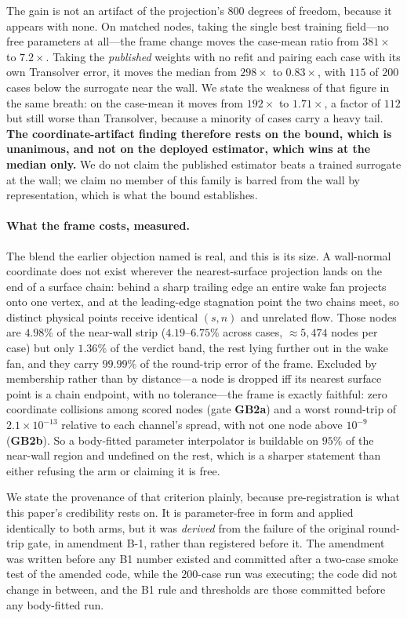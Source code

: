 The gain is not an artifact of the projection's $800$ degrees of freedom, because it
appears with none. On matched nodes, taking the single best training field---no free
parameters at all---the frame change moves the case-mean ratio from $381\times$ to
$7.2\times$. Taking the \emph{published} weights with no refit and pairing each case with its
own Transolver error, it moves the median from $298\times$ to $\mathbf{0.83\times}$, with
$115$ of $200$ cases below the surrogate near the wall. We state the weakness of that figure
in the same breath: on the case-mean it moves from $192\times$ to $1.71\times$, a factor of
$112$ but still worse than Transolver, because a minority of cases carry a heavy tail. \textbf{The coordinate-artifact
finding therefore rests on the bound, which is unanimous, and not on the deployed
estimator, which wins at the median only.} We do not claim the published estimator beats a
trained surrogate at the wall; we claim no member of this family is barred from the wall by
representation, which is what the bound establishes.

\paragraph{What the frame costs, measured.} The blend the earlier objection named is real,
and this is its size. A wall-normal coordinate does not exist wherever the
nearest-surface projection lands on the end of a surface chain: behind a sharp trailing
edge an entire wake fan projects onto one vertex, and at the leading-edge stagnation point
the two chains meet, so distinct physical points receive identical $(s,n)$ and unrelated
flow. Those nodes are $\mathbf{4.98\%}$ of the near-wall strip ($4.19$--$6.75\%$ across
cases, $\approx5{,}474$ nodes per case) but only $1.36\%$ of the verdict band, the rest
lying further out in the wake fan, and they carry $99.99\%$ of the round-trip error of the
frame. Excluded by membership rather than by
distance---a node is dropped iff its nearest surface point is a chain endpoint, with no
tolerance---the frame is exactly faithful: zero coordinate collisions among scored nodes
(gate \textbf{GB2a}) and a worst round-trip of $2.1\times10^{-13}$ relative to each
channel's spread, with not one node above $10^{-9}$ (\textbf{GB2b}). So a body-fitted
parameter interpolator is buildable on $95\%$ of the near-wall region and undefined on the
rest, which is a sharper statement than either refusing the arm or claiming it is free.

We state the provenance of that criterion plainly, because pre-registration is what this
paper's credibility rests on. It is parameter-free in form and applied identically to both
arms, but it was \emph{derived} from the failure of the original round-trip gate, in
amendment B-1, rather than registered before it. The amendment was written before any B1
number existed and committed after a two-case smoke test of the amended code, while the
$200$-case run was executing; the code did not change in between, and the B1 rule and
thresholds are those committed before any body-fitted run.

